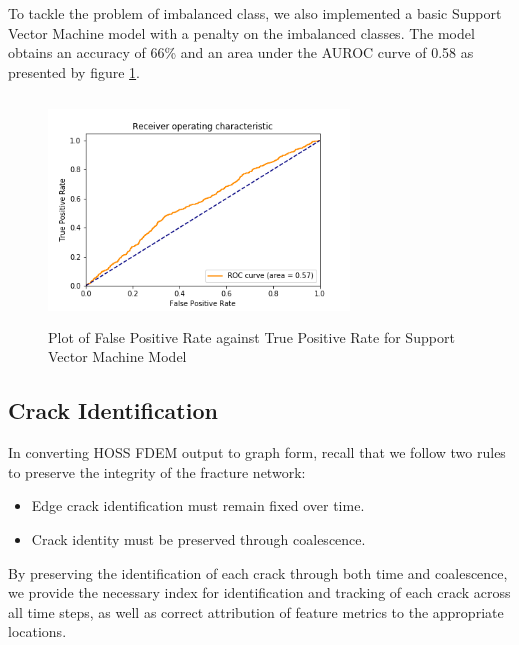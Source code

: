 To tackle the problem of imbalanced class, we also implemented a basic Support Vector Machine model with a penalty on the imbalanced classes. The model obtains an accuracy of 66\% and an area under the AUROC curve of 0.58 as presented by figure \ref{fig:svm_roc}.

\begin{figure}[H]
    \centering
    \noindent
\includegraphics[width=8cm , height = 6cm]{images/svm_roc.png}
    \caption{Plot of False Positive Rate against True Positive Rate for Support Vector Machine Model}
    \label{fig:svm_roc}
\end{figure}

\iffalse
\subsection{Crack Identification}
In converting HOSS FDEM output to graph form, recall that we follow two rules to preserve the integrity of the fracture network:
\begin{itemize}
	\item Edge crack identification must remain fixed over time.
 	\item Crack identity must be preserved through coalescence.
\end{itemize} 
By preserving the identification of each crack through both time and coalescence, we provide the necessary index for identification and tracking of each crack across all time steps, as well as correct attribution of feature metrics to the appropriate locations.
          
